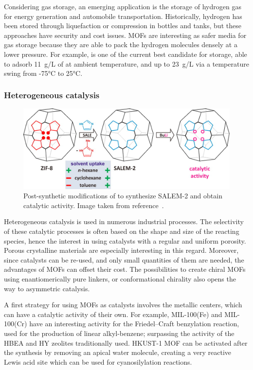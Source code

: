 \documentclass[thesis]{subfiles}
\begin{document}
Considering gas storage, an emerging application is the storage of hydrogen gas
for energy generation and automobile transportation. Historically, hydrogen has
been stored through liquefaction or compression in bottles and tanks, but these
approaches have security and cost issues. MOFs are interesting as safer media
for gas storage because they are able to pack the hydrogen molecules densely at
a lower pressure. For example,  is one of the current
best candidate for  storage, able to adsorb \SI{11}{g/L} of  at
ambient temperature, and up to \SI{23}{g/L} via a temperature swing from -75°C
to 25°C\cite{Kapelewski2018}.

\subsubsection{Heterogeneous catalysis}

\begin{figure}[ht]
    \centering
    \includegraphics[width=\textwidth]{figures/cited/zif8-to-salem2}
    \caption{Post-synthetic modifications of  to synthesize SALEM-2 and
    obtain catalytic activity. Image taken from reference~\cite{Karagiaridi2012}.}
    \label{fig:zif8-to-salem2}
\end{figure}

Heterogeneous catalysis is used in numerous industrial processes. The
selectivity of these catalytic processes is often based on the shape and size of
the reacting species, hence the interest in using catalysts with a regular and
uniform porosity. Porous crystalline materials are especially interesting in
this regard. Moreover, since catalysts can be re-used, and only small
quantities of them are needed, the advantages of MOFs can offset their cost. The
possibilities to create chiral MOFs using enantiomerically pure linkers, or
conformational chirality\cite{Tshabang2018} also opens the way to asymmetric
catalysis.

A first strategy for using MOFs as catalysts involves the metallic centers,
which can have a catalytic activity of their own. For example, MIL-100(Fe) and
MIL-100(Cr) have an interesting activity for the Friedel--Craft benzylation
reaction, used for the production of linear alkyl-benzene; surpassing the
activity of the HBEA and HY zeolites traditionally used\cite{Horcajada2007}.
HKUST-1 MOF can be activated after the synthesis by removing an apical water
molecule, creating a very reactive Lewis acid site which can be used for
cyanosilylation reactions\cite{Schlichte2004}.
\end{document}
